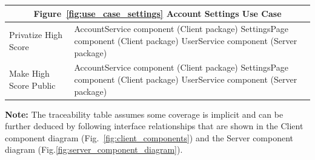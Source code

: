 \documentclass[11pt,a4paper]{article}
\begin{document}
\begin{table}
\begin{tabular}{|p{}|p{}|}
\hline
\multicolumn{2}{|c|}{\textbf {Figure~\ref{fig:use_case_settings} Account Settings Use Case} }   \\
\hline
Privatize High Score& AccountService component (Client package)\newline
SettingsPage component (Client package)\newline
UserService component (Server package)\\
\hline
Make High Score Public& AccountService component (Client package)\newline
SettingsPage component (Client package)\newline
UserService component (Server package)\\
\hline
\end{tabular}

\vspace{8pt} %

\textbf{Note:} The traceability table assumes some coverage is implicit and can be further deduced by following interface relationships that are shown in the Client component diagram (Fig.~\ref{fig:client_components}) and the Server component diagram (Fig.\ref{fig:server_component_diagram}). 
\end{table}





\end{document}
